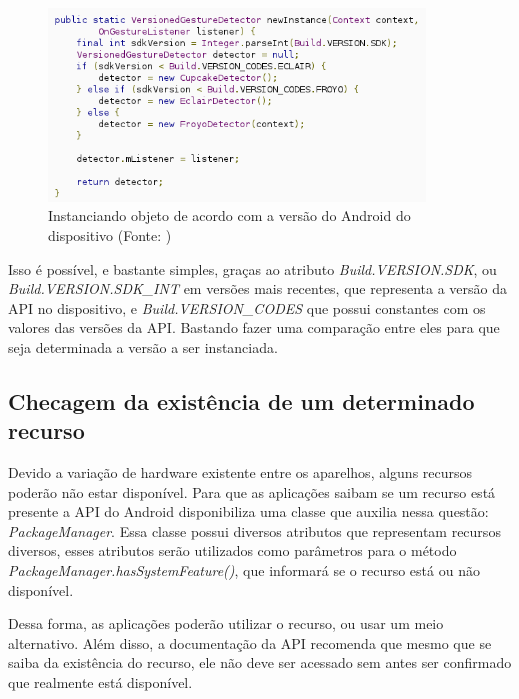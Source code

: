 \begin{figure}[h]
    \centering
    \includegraphics[width=10cm]{img/versao}
    \caption[Instanciando objeto de acordo com a versão do Android do dispositivo]{Instanciando objeto de acordo com a versão do Android do dispositivo (Fonte: \cite{check_version})}
    \label{fig_check_version}
\end{figure}

Isso é possível, e bastante simples, graças ao atributo {\it Build.VERSION.SDK}, 
ou \\ {\it Build.VERSION.SDK\_INT} em versões mais recentes, que representa a versão 
da 
API no dispositivo, e {\it Build.VERSION\_CODES} que possui constantes com os valores 
das versões da API. Bastando fazer uma comparação entre eles para que seja determinada
a versão a ser instanciada.

\subsection{Checagem da existência de um determinado recurso}

Devido a variação de hardware existente entre os aparelhos, alguns recursos poderão
não estar disponível. Para que as aplicações saibam se um recurso está presente 
 a API do Android disponibiliza uma classe que auxilia nessa questão: {\it PackageManager}.
Essa classe possui diversos atributos que representam recursos diversos, esses
 atributos serão utilizados como parâmetros para o método {\it PackageManager.hasSystemFeature()}, que informará se o recurso está ou não disponível. 
 
Dessa forma, as aplicações poderão utilizar o recurso, ou usar um meio alternativo.
Além disso, a documentação da API recomenda que mesmo que se saiba da existência 
do recurso, ele não deve ser acessado sem antes ser confirmado que realmente está 
disponível.

